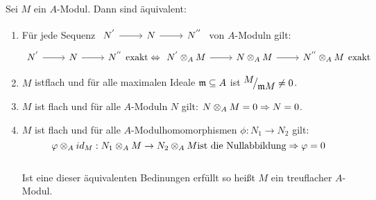 \begin{bem+df} \label{13.25}
	Sei $M$ ein $A$-Modul. Dann sind äquivalent: 
	\begin{enumerate} [label= \roman*)]
		\item Für jede Sequenz $\begin{tikzcd} N^{'} \arrow{r} & N \arrow{r} & N^{''} \end{tikzcd}$ von $A$-Moduln gilt: \\
		$$ \begin{tikzcd} N^{'} \arrow{r} & N \arrow{r} & N^{''} \end{tikzcd} \text{exakt} \Lra \begin{tikzcd} N^{'} \otimes_A M \arrow{r} & N \otimes_A M \arrow{r} & N^{''} \otimes_A M \end{tikzcd} \text{exakt} $$
		\item $M$ istflach und für alle maximalen Ideale $\mathfrak{m} \subseteq A $ ist $\QR{M}{\m M} \neq 0 $.
		\item $M$ ist flach und für alle $A$-Moduln $N$ gilt: $N \otimes_A M = 0 \Rightarrow N = 0 $.
		\item $M$ ist flach und für alle $A$-Modulhomomorphismen $\phi: N_1 \to N_2 $ gilt: 
		$$ \varphi \otimes_A id_M : N_1 \otimes_A M \to N_2 \otimes_A M \text{ist die Nullabbildung} \Rightarrow \varphi = 0 $$ \\
		Ist eine dieser äquivalenten Bedinungen erfüllt so heißt $M$ ein treuflacher $A$-Modul. 
	\end{enumerate}
\end{bem+df}
